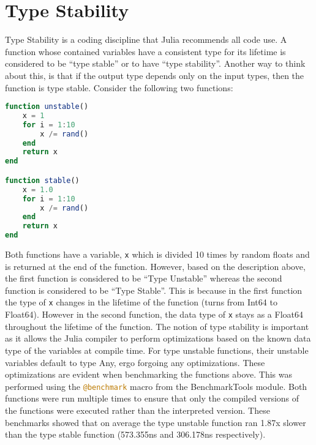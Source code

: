 \section{Type Stability}
\label{TypeStability}
Type Stability is a coding discipline that Julia recommends all code use. A function whose contained variables have a
consistent type for its lifetime is considered to be ``type stable'' or to have ``type stability''. Another way to think
about this, is that if the output type depends only on the input types, then the function is type stable. Consider the
following two functions: 
\begin{lstlisting}[language=Julia]
function unstable()
    x = 1
    for i = 1:10
        x /= rand()
    end
    return x
end

function stable()
    x = 1.0
    for i = 1:10
        x /= rand()
    end
    return x
end
\end{lstlisting}
Both functions have a variable, \lstinline[language=Julia]{x} which is divided 10 times by random floats and is returned
at the end of the function. However, based on the description above, the first function is considered to be ``Type
Unstable'' whereas the second function is considered to be ``Type Stable''. This is because in the first function the
type of \lstinline[language=Julia]{x} changes in the lifetime of the function (turns from Int64 to Float64). However in
the second function, the data type of \lstinline[language=Julia]{x} stays as a Float64 throughout the lifetime of the
function. The notion of type stability is important as it allows the Julia compiler to perform optimizations based on
the known data type of the variables at compile time. For type unstable functions, their unstable variables default to
type Any, ergo forgoing any optimizations. These optimizations are evident when benchmarking the functions above. This
was performed using the \lstinline[language=Julia]{@benchmark} macro from the BenchmarkTools module. Both functions were
run multiple times to ensure that only the compiled versions of the functions were executed rather than the interpreted
version. These benchmarks showed that on average the type unstable function ran 1.87x slower than the type stable
function (573.355ns and 306.178ns respectively).  

